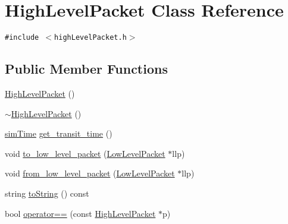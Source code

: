 \hypertarget{classHighLevelPacket}{
\section{HighLevelPacket Class Reference}
\label{classHighLevelPacket}
}
{\tt \#include $<$highLevelPacket.h$>$}

\subsection*{Public Member Functions}
\begin{CompactItemize}
\item 
\hyperlink{classHighLevelPacket_e6f7a4ec429537928d24f6a2199a3f8d}{HighLevelPacket} ()
\item 
\hyperlink{classHighLevelPacket_dc29e5ebbbb6e7c3b1d1a53b0ea14142}{$\sim$HighLevelPacket} ()
\item 
\hyperlink{genericComponentHeader_8h_d88faca783e7aa496cda721d9029a2e3}{simTime} \hyperlink{classHighLevelPacket_0ddd2a5fd2195c2ce43198c82163522c}{get\_\-transit\_\-time} ()
\item 
void \hyperlink{classHighLevelPacket_03017f87443d346d08e8ebb4281073c1}{to\_\-low\_\-level\_\-packet} (\hyperlink{classLowLevelPacket}{LowLevelPacket} $\ast$llp)
\item 
void \hyperlink{classHighLevelPacket_6a4e25020ea0c66aab015e9c2a2c8c85}{from\_\-low\_\-level\_\-packet} (\hyperlink{classLowLevelPacket}{LowLevelPacket} $\ast$llp)
\item 
string \hyperlink{classHighLevelPacket_a2292ef0554d515cf08aeed8ca46d419}{toString} () const 
\item 
bool \hyperlink{classHighLevelPacket_08e3560b71bab8b1ff31844d8ddff819}{operator==} (const \hyperlink{classHighLevelPacket}{HighLevelPacket} $\ast$p)
\end{CompactItemize}
